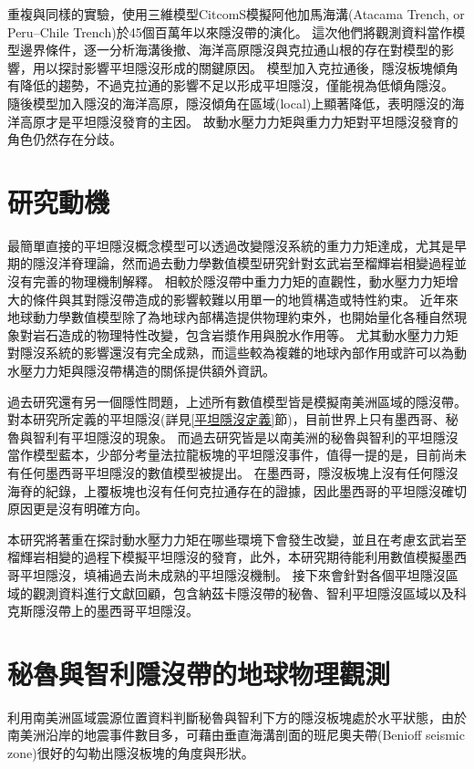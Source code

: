 \citet{Hu2016}重複與\citet{Manea2012Chile}同樣的實驗，使用三維模型CitcomS模擬阿他加馬海溝(Atacama Trench, or Peru–Chile Trench)於45個百萬年以來隱沒帶的演化。
這次他們將觀測資料當作模型邊界條件，逐一分析海溝後撤、海洋高原隱沒與克拉通山根的存在對模型的影響，用以探討影響平坦隱沒形成的關鍵原因。
模型加入克拉通後，隱沒板塊傾角有降低的趨勢，不過克拉通的影響不足以形成平坦隱沒，僅能視為低傾角隱沒。
隨後模型加入隱沒的海洋高原，隱沒傾角在區域(local)上顯著降低，表明隱沒的海洋高原才是平坦隱沒發育的主因。
故動水壓力力矩與重力力矩對平坦隱沒發育的角色仍然存在分歧。

\section{研究動機}\label{研究動機}
最簡單直接的平坦隱沒概念模型可以透過改變隱沒系統的重力力矩達成，尤其是早期的隱沒洋脊理論，然而過去動力學數值模型研究針對玄武岩至榴輝岩相變過程並沒有完善的物理機制解釋。
相較於隱沒帶中重力力矩的直觀性，動水壓力力矩增大的條件與其對隱沒帶造成的影響較難以用單一的地質構造或特性約束。
近年來地球動力學數值模型除了為地球內部構造提供物理約束外，也開始量化各種自然現象對岩石造成的物理特性改變，包含岩漿作用與脫水作用等。
尤其動水壓力力矩對隱沒系統的影響還沒有完全成熟，而這些較為複雜的地球內部作用或許可以為動水壓力力矩與隱沒帶構造的關係提供額外資訊。

過去研究還有另一個隱性問題，上述所有數值模型皆是模擬南美洲區域的隱沒帶。
對本研究所定義的平坦隱沒(詳見\ref{平坦隱沒定義}節)，目前世界上只有墨西哥、秘魯與智利有平坦隱沒的現象。
而過去研究皆是以南美洲的秘魯與智利的平坦隱沒當作模型藍本，少部分考量法拉龍板塊的平坦隱沒事件，值得一提的是，目前尚未有任何墨西哥平坦隱沒的數值模型被提出。
在墨西哥，隱沒板塊上沒有任何隱沒海脊的紀錄，上覆板塊也沒有任何克拉通存在的證據，因此墨西哥的平坦隱沒確切原因更是沒有明確方向。

本研究將著重在探討動水壓力力矩在哪些環境下會發生改變，並且在考慮玄武岩至榴輝岩相變的過程下模擬平坦隱沒的發育，此外，本研究期待能利用數值模擬墨西哥平坦隱沒，填補過去尚未成熟的平坦隱沒機制。
接下來會針對各個平坦隱沒區域的觀測資料進行文獻回顧，包含納茲卡隱沒帶的秘魯、智利平坦隱沒區域以及科克斯隱沒帶上的墨西哥平坦隱沒。


\section{秘魯與智利隱沒帶的地球物理觀測}\label{秘魯與智利隱沒帶地球物理觀測}
\citet{barazangi1976}利用南美洲區域震源位置資料判斷秘魯與智利下方的隱沒板塊處於水平狀態，由於南美洲沿岸的地震事件數目多，可藉由垂直海溝剖面的班尼奧夫帶(Benioff seismic zone)很好的勾勒出隱沒板塊的角度與形狀。


